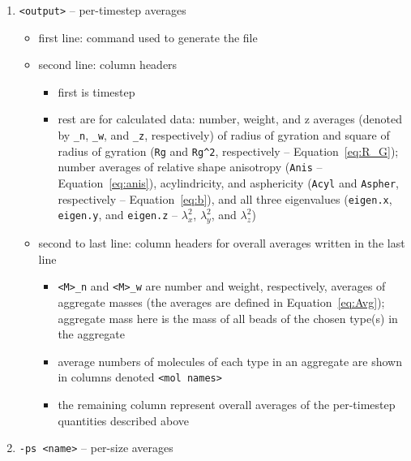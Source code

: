 \begin{enumerate}[nosep,leftmargin=20pt]
  \item \texttt{<output>} -- per-timestep averages
    \begin{itemize}[nosep,leftmargin=5pt]
      \item first line: command used to generate the file
      \item second line: column headers
        \begin{itemize}[nosep,leftmargin=10pt]
          \item first is timestep
          \item rest are for calculated data: number, weight, and z
            averages (denoted by \texttt{\_n}, \texttt{\_w}, and
            \texttt{\_z}, respectively) of radius of gyration and square of
            radius of gyration (\texttt{Rg} and \texttt{Rg\^{}2},
            respectively -- Equation~\eqref{eq:R_G}); number averages of
            relative shape anisotropy (\texttt{Anis} --
            Equation~\eqref{eq:anis}), acylindricity, and asphericity
            (\texttt{Acyl} and \texttt{Aspher}, respectively --
            Equation~\eqref{eq:b}), and all three eigenvalues
            (\texttt{eigen.x}, \texttt{eigen.y}, and \texttt{eigen.z} --
            $\lambda_x^2$, $\lambda_y^2$, and $\lambda_z^2$)
        \end{itemize}
      \item second to last line: column headers for overall averages
        written in the last line
        \begin{itemize}[nosep,leftmargin=10pt]
          \item \texttt{<M>\_n} and \texttt{<M>\_w} are
            number and weight, respectively, averages of aggregate
            masses (the averages are defined in Equation~\eqref{eq:Avg});
            aggregate mass here is the mass of all beads of the chosen
            type(s) in the aggregate
          \item average numbers of molecules of each type in an aggregate
            are shown in columns denoted \texttt{<mol names>}
          \item the remaining column represent overall averages of the
            per-timestep quantities described above
        \end{itemize}
    \end{itemize}
  \item \texttt{-ps <name>} -- per-size averages
  \begin{itemize}[nosep,leftmargin=5pt]

\end{itemize}
\end{enumerate}
